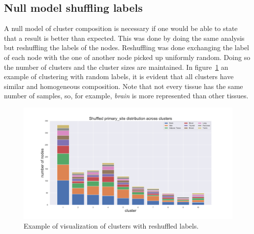 \subsection{Null model shuffling labels}
A null model of cluster composition is necessary if one would be able to state that a result is better than expected. This was done by doing the same analysis but reshuffling the labels of the nodes. Reshuffling was done exchanging the label of each node with the one of another node picked up uniformly random. Doing so the number of clusters and the cluster sizes are maintained. In figure~\ref{fig:topic/gtex/oversigma_10tissue/shuffledclustercomposition_l3_primary_site} an example of clustering with random labels, it is evident that all clusters have similar and homogeneous composition. Note that not every tissue has the same number of samples, so, for example, \textit{brain} is more represented than other tissues.
\begin{figure}[htb!]
	\centering
	\includegraphics[width=0.9\linewidth]{pictures/topic/gtex/oversigma_10tissue/shuffledclustercomposition_l3_primary_site}
	\caption{Example of visualization of clusters with reshuffled labels.}
	\label{fig:topic/gtex/oversigma_10tissue/shuffledclustercomposition_l3_primary_site}
\end{figure}

